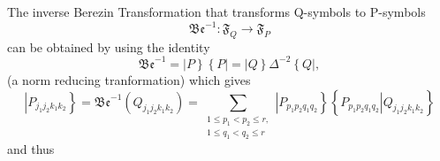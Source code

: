 \documentclass[aps,preprint]{revtex4}%
\begin{document}
The inverse Berezin Transformation that transforms Q-symbols to P-symbols
\begin{equation}
\mathfrak{Be}^{-1}:\mathfrak{F}_{Q}\rightarrow\mathfrak{F}_{P}%
\end{equation}
can be obtained by using the identity%
\begin{equation}
\mathfrak{Be}^{-1}=\left\vert P\right\}  \left\{  P\right\vert =\left\vert
Q\right\}  \Delta^{-2}\left\{  Q\right\vert ,
\end{equation}
(a norm reducing tranformation) which gives%
\begin{equation}
\left\vert P_{j_{1}j_{2}k_{1}k_{2}}\right\}  =\mathfrak{Be}^{-1}\left(
Q_{j_{1}j_{2}k_{1}k_{2}}\right)  =\sum_{\substack{1\leq p_{1}<p_{2}\leq
r,\\1\leq q_{1}<q_{2}\leq r}}\left\vert P_{p_{1}p_{2}q_{1}q_{2}}\right\}
\left\{  \left.  P_{p_{1}p_{2}q_{1}q_{2}}\right\vert Q_{j_{1}j_{2}k_{1}k_{2}%
}\right\}
\end{equation}
and thus%
\end{document}
